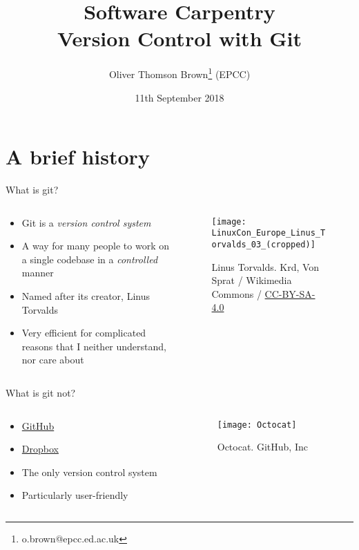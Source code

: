 \documentclass[presentation]{beamer}
\author{Oliver Thomson Brown\thanks{o.brown@epcc.ed.ac.uk} (EPCC)}
\date{11th September 2018}
\title{Software Carpentry \\ Version Control with Git}
\begin{document}
\maketitle

\section{A brief history}
\begin{frame}{What is git?}
	\begin{columns}
		\begin{column}{0.5\textwidth}
			\begin{itemize}
				\item Git is a \emph{version control system}
				\item A way for many people to work on a single codebase in a \emph{controlled} manner
				\item Named after its creator, Linus Torvalds
				\item Very efficient for complicated reasons that I neither understand, nor care about
			\end{itemize}
		\end{column}
		\begin{column}{0.5\textwidth}
			\begin{figure}
				\centering
				\texttt{[image: LinuxCon\_Europe\_Linus\_Torvalds\_03\_(cropped)]}
				\caption{\label{fig:0-1}Linus Torvalds. \textcopyright Krd, Von Sprat / Wikimedia Commons / \href{https://creativecommons.org/licenses/by-sa/4.0/}{CC-BY-SA-4.0} }
			\end{figure}		
		\end{column}
	\end{columns}
\end{frame}

\begin{frame}{What is git not?}
	\begin{columns}
		\begin{column}{0.5\textwidth}
			\begin{itemize}
				\item \href{https://github.com/}{GitHub}
				\item \href{https://www.dropbox.com/}{Dropbox}
				\item The only version control system
				\item Particularly user-friendly
			\end{itemize}
		\end{column}
		\begin{column}{0.5\textwidth}
			\begin{figure}
				\centering
				\texttt{[image: Octocat]}
				\caption{\label{fig:0-2}Octocat.  GitHub, Inc}
			\end{figure}		
		\end{column}
	\end{columns}
\end{frame}
\end{document}

